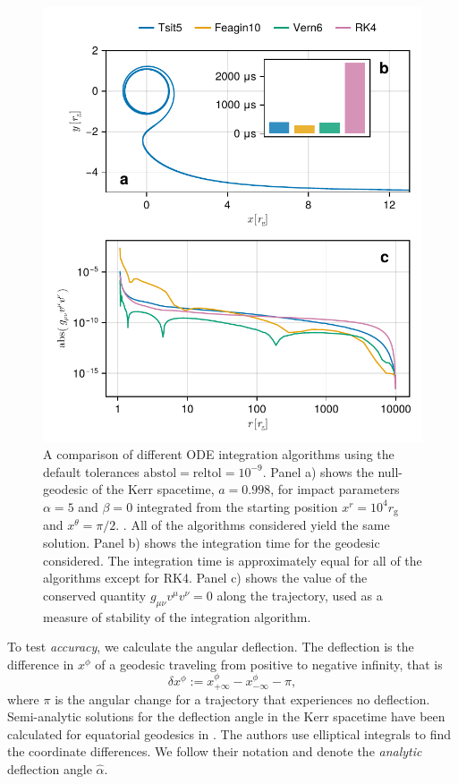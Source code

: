 \documentclass[fleqn,usenatbib]{mnras}
\newcommand{\rg}{r_\text{g}}
\begin{document}
\begin{figure}
	\centering
	\includegraphics[width=0.95\linewidth]{figures/stability.conservation.pdf}
	\caption{A comparison of different ODE integration algorithms using the default
    tolerances $\text{abstol} = \text{reltol} = 10^{-9}$. Panel a) shows the
    null-geodesic of the Kerr spacetime, $a = 0.998$, for impact parameters
    $\alpha = 5$ and $\beta = 0$ integrated from the starting position $x^r =
    10^4 \rg$ and $x^\theta = \pi / 2$.  . All of the algorithms considered
    yield the same solution. Panel b) shows the integration time for the
    geodesic considered. The integration time is approximately equal for all of
    the algorithms except for RK4. Panel c) shows the value of the conserved
    quantity $g_{\mu \nu} v^\mu v^\nu = 0$ along the trajectory, used as a
    measure of stability of the integration algorithm.
}
	\label{fig:dot-stability}
\end{figure}

To test \emph{accuracy}, we calculate the angular deflection. The deflection is
the difference in $x^\phi$ of a geodesic traveling from positive to negative
infinity, that is
\begin{equation}
	\delta x^\phi :=
		x^\phi_{+\infty} - x^\phi_{-\infty}
		- \pi,
\end{equation}
where $\pi$ is the angular change for a trajectory that experiences no
deflection. Semi-analytic solutions for the deflection angle in the Kerr
spacetime have been calculated for equatorial geodesics in
\cite{iyer_lights_2009}. The authors use elliptical integrals to find the
coordinate differences. We follow their notation and denote the \emph{analytic}
deflection angle $\hat{\alpha}$.
\end{document}
